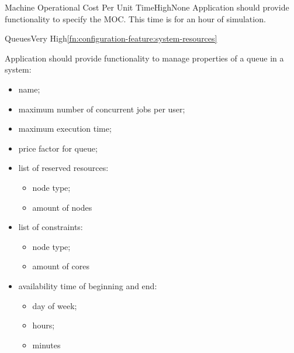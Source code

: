 	\begin{functional}{Machine Operational Cost Per Unit Time}{High}{None}
		\label{fn:configuration-feature:machine-opertional-cost-per-unit-time}
		{
			Application should provide functionality to specify the \gls{MOC}. This time is for an hour of simulation.
		}
	\end{functional}

	\begin{functional}{Queues}{Very High}{\ref{fn:configuration-feature:system-resources}}
		\label{fn:configuration-feature:queues}
		{
			Application should provide functionality to manage properties of a queue in a system:
			\begin{itemize}
				\item name;
				\item maximum number of concurrent jobs per user;
				\item maximum execution time;
				\item price factor for queue;
				\item
				{
					list of reserved resources:
					\begin{itemize}
						\item node type;
						\item amount of nodes
					\end{itemize}
				}
				\item
				{
					list of constraints:
					\begin{itemize}
						\item node type;
						\item amount of cores
					\end{itemize}
				}
				\item 
				{
					availability time of beginning and end:
					\begin{itemize}
						\item day of week;
						\item hours;
						\item minutes
					\end{itemize}
				}
			\end{itemize} 
		}
	\end{functional}

